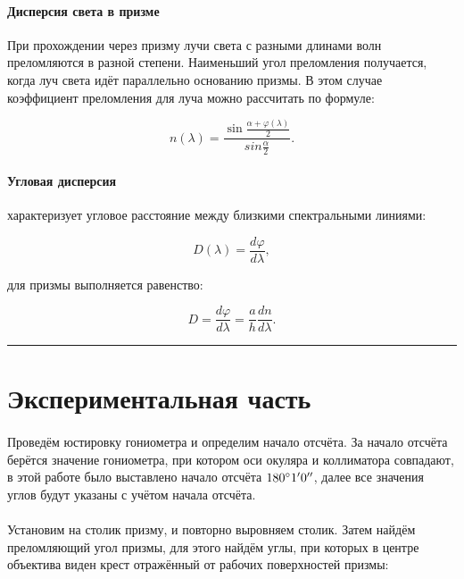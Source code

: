 \documentclass[a4paper,12pt]{article} %
\begin{document}
\paragraph{Дисперсия света в призме} При прохождении через призму лучи света с разными длинами волн преломляются в разной степени. Наименьший угол преломления получается, когда луч света идёт параллельно основанию призмы. В этом случае коэффициент преломления для луча можно рассчитать по формуле:

\begin{equation}
n(\lambda) = \frac{\sin \frac{\alpha + \varphi (\lambda)}{2}}{sin \frac{\alpha}{2}}.
\label{e:n}
\end{equation}

\paragraph{Угловая дисперсия} характеризует угловое расстояние между близкими спектральными линиями:

\[
D(\lambda) = \frac{d\varphi}{d\lambda},
\]

\noindent для призмы выполняется равенство:

\begin{equation}
D = \frac{d\varphi}{d\lambda} = \frac{a}{h} \frac{dn}{d\lambda}.
\label{e:disp}
\end{equation}



\medskip\hrule\medskip

\section{Экспериментальная часть}

\paragraph{} Проведём юстировку гониометра и определим начало отсчёта. За начало отсчёта берётся значение гониометра, при котором оси окуляра и коллиматора совпадают, в этой работе было выставлено начало отсчёта $180 \degree 1'0''$, далее все значения углов будут указаны с учётом начала отсчёта.

\paragraph{} Установим на столик призму, и повторно выровняем столик. Затем найдём преломляющий угол призмы, для этого найдём углы, при которых в центре объектива виден крест отражённый от рабочих поверхностей призмы:
\end{document}
